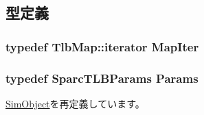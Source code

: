\subsection{型定義}
\hypertarget{classSparcISA_1_1TLB_a52ffc8e6c7bc8d7037f59391c2a93750}{
\subsubsection[{MapIter}]{\setlength{\rightskip}{0pt plus 5cm}typedef {\bf TlbMap::iterator} {\bf MapIter}}}
\label{classSparcISA_1_1TLB_a52ffc8e6c7bc8d7037f59391c2a93750}
\hypertarget{classSparcISA_1_1TLB_a3073524452e67556982db4c27c5f18ea}{
\subsubsection[{Params}]{\setlength{\rightskip}{0pt plus 5cm}typedef SparcTLBParams {\bf Params}}}
\label{classSparcISA_1_1TLB_a3073524452e67556982db4c27c5f18ea}


\hyperlink{classSimObject_a0f0761d2db586a23bb2a2880b8f387bb}{SimObject}を再定義しています。

